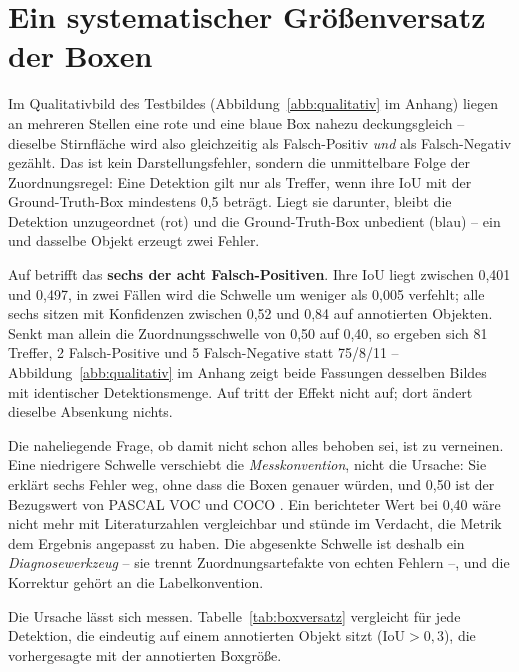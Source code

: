 \section{Ein systematischer Größenversatz der Boxen}
\label{sec:boxversatz}

Im Qualitativbild des Testbildes (Abbildung~\ref{abb:qualitativ} im Anhang)
liegen an mehreren Stellen eine rote und eine blaue Box nahezu deckungsgleich --
dieselbe Stirnfläche wird also gleichzeitig als Falsch-Positiv \emph{und} als
Falsch-Negativ gezählt. Das ist kein Darstellungsfehler, sondern die unmittelbare
Folge der Zuordnungsregel: Eine Detektion gilt nur als Treffer, wenn ihre IoU mit
der Ground-Truth-Box mindestens 0,5 beträgt. Liegt sie darunter, bleibt die
Detektion unzugeordnet (rot) und die Ground-Truth-Box unbedient (blau) -- ein und
dasselbe Objekt erzeugt zwei Fehler.

Auf  betrifft das \textbf{sechs der acht Falsch-Positiven}. Ihre IoU
liegt zwischen 0,401 und 0,497, in zwei Fällen wird die Schwelle um weniger als
0,005 verfehlt; alle sechs sitzen mit Konfidenzen zwischen 0,52 und 0,84 auf
annotierten Objekten. Senkt man allein die Zuordnungsschwelle von 0,50 auf 0,40,
so ergeben sich 81 Treffer, 2 Falsch-Positive und 5 Falsch-Negative statt
75/8/11 -- Abbildung~\ref{abb:qualitativ} im Anhang zeigt beide Fassungen
desselben Bildes mit identischer Detektionsmenge. Auf  tritt der
Effekt nicht auf; dort ändert dieselbe Absenkung nichts.

Die naheliegende Frage, ob damit nicht schon alles behoben sei, ist zu
verneinen. Eine niedrigere Schwelle verschiebt die \emph{Messkonvention}, nicht
die Ursache: Sie erklärt sechs Fehler weg, ohne dass die Boxen genauer würden,
und 0,50 ist der Bezugswert von PASCAL VOC und COCO
\parencite{everingham2010,lin2014coco}. Ein berichteter Wert bei 0,40 wäre nicht
mehr mit Literaturzahlen vergleichbar und stünde im Verdacht, die Metrik dem
Ergebnis angepasst zu haben. Die abgesenkte Schwelle ist deshalb ein
\emph{Diagnosewerkzeug} -- sie trennt Zuordnungsartefakte von echten Fehlern --,
und die Korrektur gehört an die Labelkonvention.

 Die Ursache lässt sich messen.
Tabelle~\ref{tab:boxversatz} vergleicht für jede Detektion, die eindeutig auf
einem annotierten Objekt sitzt ($\mathrm{IoU} > 0{,}3$), die vorhergesagte mit
der annotierten Boxgröße.

